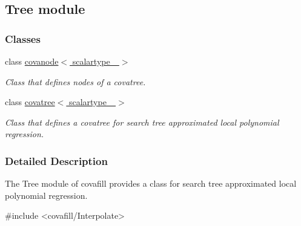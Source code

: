 \hypertarget{group__tree}{}\subsection{Tree module}
\label{group__tree}
\subsubsection*{Classes}
\begin{DoxyCompactItemize}
\item 
class \hyperlink{classcovanode}{covanode$<$ scalartype\+\_\+ $>$}
\begin{DoxyCompactList}\small\item\em Class that defines nodes of a covatree. \end{DoxyCompactList}\item 
class \hyperlink{classcovatree}{covatree$<$ scalartype\+\_\+ $>$}
\begin{DoxyCompactList}\small\item\em Class that defines a covatree for search tree approximated local polynomial regression. \end{DoxyCompactList}\end{DoxyCompactItemize}


\subsubsection{Detailed Description}
The Tree module of covafill provides a class for search tree approximated local polynomial regression. \begin{DoxyVerb}#include <covafill/Interpolate>
\end{DoxyVerb}
 